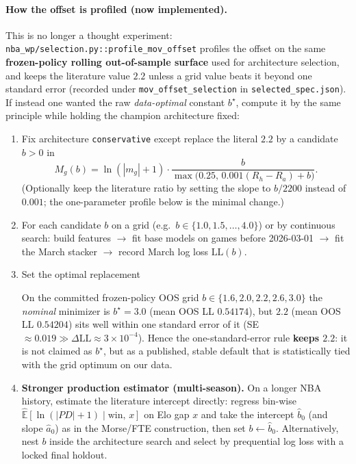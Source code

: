\documentclass[10pt]{article}
\newcommand{\code}[1]{\texttt{#1}}
\begin{document}
\paragraph{How the offset is profiled (now implemented).}
This is no longer a thought experiment: \code{nba\_wp/selection.py::profile\_mov\_offset}
profiles the offset on the same \textbf{frozen-policy rolling out-of-sample surface}
used for architecture selection, and keeps the literature value \(2.2\) unless a
grid value beats it beyond one standard error (recorded under
\code{mov\_offset\_selection} in \code{selected\_spec.json}). If instead one wanted
the raw \emph{data-optimal} constant \(b^\star\), compute it by the same principle
while holding the champion architecture fixed:

\begin{enumerate}
\item Fix architecture \texttt{conservative} except replace the literal \(2.2\) by a
candidate \(b>0\) in
\[
M_g(b)
=
\ln(|m_g|+1)
\cdot
\frac{b}{\max\bigl(0.25,\,0.001(R_h-R_a)+b\bigr)}.
\]
(Optionally keep the literature ratio by setting the slope to \(b/2200\) instead
of \(0.001\); the one-parameter profile below is the minimal change.)
\item For each candidate \(b\) on a grid
(e.g.\ \(b\in\{1.0,1.5,\ldots,4.0\}\)) or by continuous search:
build features \(\rightarrow\) fit base models on games before 2026-03-01
\(\rightarrow\) fit the March stacker \(\rightarrow\) record March log loss
\(\mathrm{LL}(b)\).
\item Set the optimal replacement
\begin{center}
\end{center}
On the committed frozen-policy OOS grid \(b\in\{1.6,2.0,2.2,2.6,3.0\}\) the
\emph{nominal} minimizer is \(b^{\star}=3.0\) (mean OOS LL \(0.54174\)), but \(2.2\)
(mean OOS LL \(0.54204\)) sits well within one standard error of it
(SE \(\approx 0.019 \gg \Delta\mathrm{LL}\approx 3\times10^{-4}\)). Hence the
one-standard-error rule \textbf{keeps \(2.2\)}: it is not claimed as \(b^{\star}\),
but as a published, stable default that is statistically tied with the grid
optimum on our data.
\item \textbf{Stronger production estimator (multi-season).}
On a longer NBA history, estimate the literature intercept directly:
regress bin-wise
\(\widehat{\mathbb{E}}[\ln(|PD|+1)\mid\mathrm{win},\,x]\)
on Elo gap \(x\) and take the intercept \(\hat b_0\) (and slope \(\hat a_0\))
as in the Morse/FTE construction, then set \(b\leftarrow\hat b_0\).
Alternatively, nest \(b\) inside the architecture search and select by
prequential log loss with a locked final holdout.
\end{enumerate}
\end{document}
